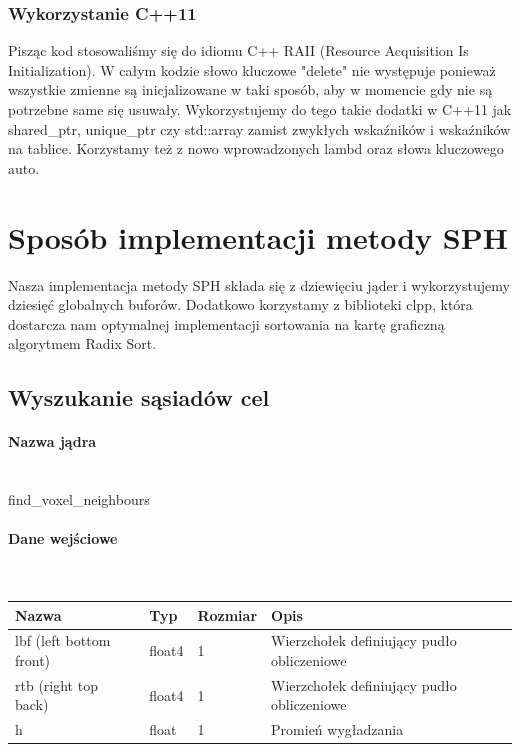 \documentclass[polish, 12pt]{aghthesis}
\begin{document}
		\subsubsection{Wykorzystanie C++11}
		
		Pisząc kod stosowaliśmy się do idiomu C++ RAII (Resource Acquisition Is Initialization). W całym kodzie słowo kluczowe "delete" nie występuje ponieważ wszystkie zmienne są inicjalizowane w taki sposób, aby w momencie gdy nie są potrzebne same się usuwały. Wykorzystujemy do tego takie dodatki w C++11 jak shared\_ptr, unique\_ptr czy std::array zamist zwykłych wskaźników i wskaźników na tablice. Korzystamy też z nowo wprowadzonych lambd oraz słowa kluczowego auto.

\section{Sposób implementacji metody SPH}
Nasza implementacja metody SPH składa się z dziewięciu jąder i wykorzystujemy dziesięć globalnych buforów. Dodatkowo korzystamy z biblioteki clpp, która dostarcza nam optymalnej implementacji sortowania na kartę graficzną algorytmem Radix Sort.
		
		\subsection{Wyszukanie sąsiadów cel}
			\paragraph{Nazwa jądra} \ \\
				find\_voxel\_neighbours
			\paragraph{Dane wejściowe} \ \\
					\begin{tabular}{| p{} | p{} | p{} | p{} |}
					\hline
						Nazwa & Typ & Rozmiar & Opis \\
					\hline
						lbf (left bottom front)& float4 & 1 & Wierzchołek definiujący pudło obliczeniowe \\ 
					\hline
						rtb (right top back) & float4 & 1 & Wierzchołek definiujący pudło obliczeniowe  \\ 
					\hline
						h & float & 1 & Promień wygładzania \\ 
					\hline
    				\end{tabular}
\end{document}
